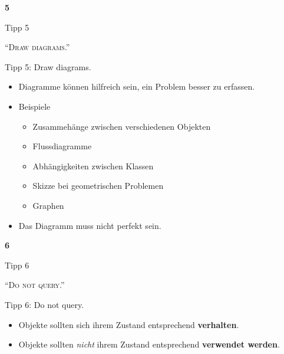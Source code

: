 \documentclass[18pt]{beamer}
\newcommand{\quotes}[1]{``#1''}
\begin{document}
\begin{frame}{\quad}
    \center
    \Huge{\textbf{5}}
\end{frame}

\begin{frame}{Tipp 5}
    \begin{block}{}
        \center
        \textsc{\quotes{Draw diagrams.}}
    \end{block}
\end{frame}

\begin{frame}{Tipp 5: Draw diagrams.}
    \begin{itemize}
        \item Diagramme können hilfreich sein, ein Problem besser zu erfassen.
        \item Beispiele
        \begin{itemize}
            \item Zusammehänge zwischen verschiedenen Objekten
            \item Flussdiagramme
            \item Abhängigkeiten zwischen Klassen
            \item Skizze bei geometrischen Problemen
            \item Graphen
        \end{itemize}
        \item Das Diagramm muss nicht perfekt sein.
    \end{itemize}
\end{frame}

\begin{frame}{\quad}
    \center
    \Huge{\textbf{6}}
\end{frame}

\begin{frame}{Tipp 6}
    \begin{block}{}
        \center
        \textsc{\quotes{Do not query.}}
    \end{block}
\end{frame}

\begin{frame}{Tipp 6: Do not query.}
    \begin{itemize}
        \item Objekte sollten sich ihrem Zustand entsprechend \textbf{verhalten}.
        \item Objekte sollten \textit{nicht} ihrem Zustand entsprechend \textbf{verwendet werden}.
    \end{itemize}
\end{frame}
\end{document}
